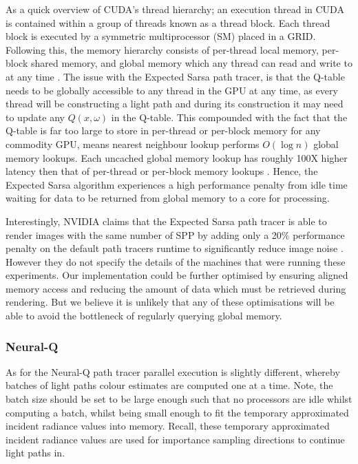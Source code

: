 \documentclass[../dissertation.tex]{subfiles}
\begin{document}
As a quick overview of CUDA's thread hierarchy; an execution thread in CUDA is contained within a group of threads known as a thread block. Each thread block is executed by a symmetric multiprocessor (SM) placed in a GRID. Following this, the memory hierarchy consists of per-thread local memory, per-block shared memory, and global memory which any thread can read and write to at any time \cite{cuda_c_guide}. The issue with the Expected Sarsa path tracer, is that the Q-table needs to be globally accessible to any thread in the GPU at any time, as every thread will be constructing a light path and during its construction it may need to update any $Q(x, \omega)$ in the Q-table. This compounded with the fact that the Q-table is far too large to store in per-thread or per-block memory for any commodity GPU, means nearest neighbour lookup performs $O(\log n)$ global memory lookups. Each uncached global memory lookup has roughly 100X higher latency then that of per-thread or per-block memory lookups \cite{global_vs_shared}. Hence, the Expected Sarsa algorithm experiences a high performance penalty from idle time waiting for data to be returned from global memory to a core for processing. 

Interestingly, NVIDIA claims that the Expected Sarsa path tracer is able to render images with the same number of SPP by adding only a 20\% performance penalty on the default path tracers runtime  to significantly reduce image noise \cite{dahm2017learning}. However they do not specify the details of the machines that were running these experiments. Our implementation could be further optimised by ensuring aligned memory access and reducing the amount of data which must be retrieved during rendering. But we believe it is unlikely that any of these optimisations will be able to avoid the bottleneck of regularly querying global memory.

\subsubsection{Neural-Q}

As for the Neural-Q path tracer parallel execution is slightly different, whereby batches of light paths colour estimates are computed one at a time. Note, the batch size should be set to be large enough such that no processors are idle whilst computing a batch, whilst being small enough to fit the temporary approximated incident radiance values into memory. Recall, these temporary approximated incident radiance values are used for importance sampling directions to continue light paths in. 
\end{document}
